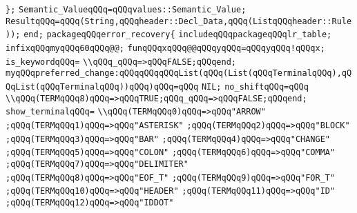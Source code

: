 \verb|};|\newline
\verb|Semantic_ValueqQQq=qQQqvalues::Semantic_Value;|\newline
\verb|ResultqQQq=qQQq(String,qQQqheader::Decl_Data,qQQq(ListqQQqheader::Rule));|\newline
\verb|end;|\newline
\verb|packageqQQqerror_recovery{|\newline
\verb|includeqQQqpackageqQQqlr_table;|\newline
\verb|infixqQQqmyqQQq60qQQq@@;|\newline
\verb|funqQQqxqQQq@@qQQqyqQQq=qQQqyqQQq!qQQqx;|\newline
\verb|is_keywordqQQq=|\newline
\verb|\\qQQq_qQQq=>qQQqFALSE;qQQqend;|\newline
\verb|myqQQqpreferred_change:qQQqqQQqqQQqList(qQQq(List(qQQqTerminalqQQq),qQQqList(qQQqTerminalqQQq))qQQq)qQQq=qQQq|\newline
\verb|NIL;|\newline
\verb|no_shiftqQQq=qQQq|\newline
\verb|\\qQQq(TERMqQQq8)qQQq=>qQQqTRUE;qQQq_qQQq=>qQQqFALSE;qQQqend;|\newline
\verb|show_terminalqQQq=|\newline
\verb|\\qQQq(TERMqQQq0)qQQq=>qQQq"ARROW"|\newline
\verb|;qQQq(TERMqQQq1)qQQq=>qQQq"ASTERISK"|\newline
\verb|;qQQq(TERMqQQq2)qQQq=>qQQq"BLOCK"|\newline
\verb|;qQQq(TERMqQQq3)qQQq=>qQQq"BAR"|\newline
\verb|;qQQq(TERMqQQq4)qQQq=>qQQq"CHANGE"|\newline
\verb|;qQQq(TERMqQQq5)qQQq=>qQQq"COLON"|\newline
\verb|;qQQq(TERMqQQq6)qQQq=>qQQq"COMMA"|\newline
\verb|;qQQq(TERMqQQq7)qQQq=>qQQq"DELIMITER"|\newline
\verb|;qQQq(TERMqQQq8)qQQq=>qQQq"EOF_T"|\newline
\verb|;qQQq(TERMqQQq9)qQQq=>qQQq"FOR_T"|\newline
\verb|;qQQq(TERMqQQq10)qQQq=>qQQq"HEADER"|\newline
\verb|;qQQq(TERMqQQq11)qQQq=>qQQq"ID"|\newline
\verb|;qQQq(TERMqQQq12)qQQq=>qQQq"IDDOT"|\newline

